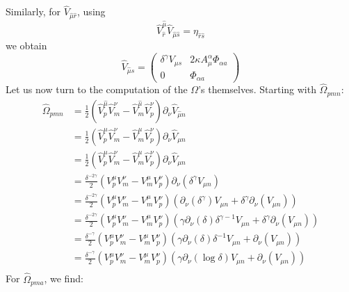 \documentclass{article}
\begin{document}
Similarly, for $\hat V_{\hat \mu\hat r}$, using
\begin{equation*}
    \hat V^{\hat \mu}_{\hat r} \hat V_{\hat \mu\hat s}= \eta_{ \hat r \hat s}
\end{equation*}
we obtain
\begin{equation}
    \hat V_{\hat \mu \hat s} = \begin{pmatrix} 
        \delta^\gamma V_{\mu s } & 2 \kappa A^\alpha_\mu \Phi_{\alpha a } \\ 0 & \Phi_{\alpha a }
    \end{pmatrix}
\end{equation}
Let us now turn to the computation of the $\Omega$'s themselves. Starting with $\hat \Omega_{pmn}$:
\begin{align*}
    \hat \Omega_{pmn} &= \frac{1}{2}(\hat V^{\hat \mu}_{  p} \hat V^{ \nu}_{m}-\hat V^{\hat \mu}_{m} \hat V^{ \nu}_{p})\partial_{ \nu} \hat V_{\hat \mu n}\\
    &= \frac{1}{2}(\hat V^{ \mu}_{  p} \hat V^{ \nu}_{m}-\hat V^{ \mu}_{m} \hat V^{ \nu}_{p})\partial_{ \nu} \hat V_{ \mu n}\\
    &= \frac{1}{2}(\hat V^{ \mu}_{  p} \hat V^{ \nu}_{m}-\hat V^{ \mu}_{m} \hat V^{ \nu}_{p})\partial_{ \nu} \hat V_{ \mu n}\\
    &= \frac{\delta^{-2 \gamma}}{2}(V^{ \mu}_{  p} V^{ \nu}_{m}- V^{ \mu}_{m} V^{ \nu}_{p})\partial_{ \nu} (\delta^{\gamma} V_{ \mu n})\\
    &= \frac{\delta^{-2 \gamma}}{2}(V^{ \mu}_{  p} V^{ \nu}_{m}- V^{ \mu}_{m} V^{ \nu}_{p})(\partial_{ \nu} (\delta^{\gamma}) V_{ \mu n} + \delta^{\gamma}\partial_{ \nu}( V_{ \mu n}))\\
    &= \frac{\delta^{-2 \gamma}}{2}(V^{ \mu}_{  p} V^{ \nu}_{m}- V^{ \mu}_{m} V^{ \nu}_{p})( \gamma \partial_{ \nu}(\delta) \delta^{\gamma-1} V_{ \mu n} + \delta^{\gamma}\partial_{ \nu}( V_{ \mu n}))\\
    &= \frac{\delta^{- \gamma}}{2}(V^{ \mu}_{  p} V^{ \nu}_{m}- V^{ \mu}_{m} V^{ \nu}_{p})( \gamma \partial_{ \nu}(\delta) \delta^{-1} V_{ \mu n} + \partial_{ \nu}( V_{ \mu n}))\\
    &= \frac{\delta^{- \gamma}}{2}(V^{ \mu}_{  p} V^{ \nu}_{m}- V^{ \mu}_{m} V^{ \nu}_{p})( \gamma \partial_{ \nu}(\log{\delta}) V_{ \mu n} + \partial_{ \nu}( V_{ \mu n}))\\
\end{align*}
For $\hat \Omega_{pma}$, we find:
\end{document}
